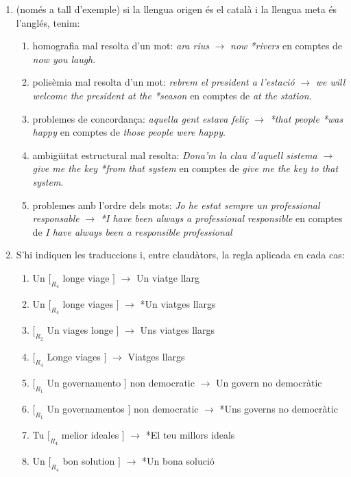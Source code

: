 \begin{enumerate}
    \item (només a tall d'exemple) si la llengua origen és el català i
      la llengua meta és l'anglés, tenim:
      \begin{enumerate}
      \item homografia mal resolta d'un mot: \emph{ara rius} $\to$
        \emph{now *rivers} en comptes de \emph{now you laugh}.
      \item polisèmia mal resolta d'un mot: \emph{rebrem el president
          a l'estació} $\to$ \emph{we will welcome the president at
          the *season} en comptes de \emph{at the station}.
      \item problemes de concordança: \emph{aquella gent estava feliç}
          $\to$ \emph{*that people *was happy} en comptes de
          \emph{those people were happy}.
      \item ambigüitat estructural mal resolta: \emph{Dona'm la clau 
          d'aquell sistema} $\to$ \emph{give me the key *from that system}
        en comptes de \emph{give me the key to that system}.
      \item problemes amb l'ordre dels mots: \emph{Jo he estat sempre
          un professional responsable} $\to$ \emph{*I have been always
          a professional responsible} en comptes de \emph{I have
          always been a responsible professional}
      \end{enumerate}

    \item S'hi indiquen les traduccions i, entre claudàtors, la regla
      aplicada en cada cas:
      \begin{enumerate}
      \item \textsf{Un $[_{R_4}$ longe viage $]$} $\to$ Un viatge llarg
      \item \textsf{Un $[_{R_4}$ longe viages $]$} $\to$ *Un viatges llargs
      \item \textsf{$[_{R_2}$ Un viages longe $]$} $\to$ Uns viatges llargs
      \item \textsf{$[_{R_4}$ Longe viages $]$} $\to$ Viatges llargs
      \item \textsf{$[_{R_1}$ Un governamento $]$ non democratic}
        $\to$ Un govern no democràtic
      \item \textsf{$[_{R_1}$ Un governamentos $]$ non democratic}
        $\to$ *Uns governs no democràtic
      \item \textsf{Tu $[_{R_4}$ melior ideales $]$} $\to$ *El teu millors ideals
      \item \textsf{Un $[_{R_4}$ bon solution $]$} $\to$ *Un bona solució
      \end{enumerate}



\end{enumerate}
